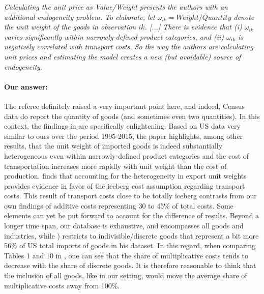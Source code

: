 \documentclass[a4paper,11pt]{article}
\begin{document}
\textit{Calculating the unit price as Value/Weight presents the authors
with an additional endogeneity problem. To elaborate, let $\omega_{ik} = Weight/Quantity$
denote the unit weight of the goods in observation $ik$. [...] There is evidence that (i) $\omega_{ik}$ varies significantly within narrowly-defined product
categories, and (ii) $\omega_{ik}$ is negatively correlated with transport costs. So the
way the authors are calculating unit prices and estimating the model creates a
new (but avoidable) source of endogeneity.}

\paragraph{Our answer:}
\noindent %
The referee definitely raised a very important point here, and indeed, Census data do report the quantity of goods (and sometimes even two quantities).
In this context, the findings in \cite{Lashkaripour_JIE2020} are specifically enlightening.
Based on US data very similar to ours over the period 1995-2015, the paper highlights, among other results, that the unit weight of imported goods is indeed substantially heterogeneous even within narrowly-defined product categories and the cost of transportation increases more rapidly with unit weight than the cost of production. \cite{Lashkaripour_JIE2020} finds that accounting for the heterogeneity in export unit weights provides evidence in favor of the iceberg cost assumption regarding transport costs.
This result of transport costs close to be totally iceberg contrasts from our own findings of additive costs representing 30 to 45\% of total costs. Some elements can yet be put forward to account for the difference of results. Beyond a longer time span, our database is exhaustive, and encompasses all goods and industries, while \citet{Lashkaripour_JIE2020}) restricts to indivisible/discrete goods that represent a bit more 56\% of US total imports of goods in his dataset. In this regard, when comparing Tables 1 and 10 in \citet{Lashkaripour_JIE2020}, one can see that the share of multiplicative costs tends to decrease with the share of discrete goods. It is therefore reasonable to think that the inclusion of all goods, like in our setting, would move the average share of multiplicative costs away from 100\%.
\end{document}

